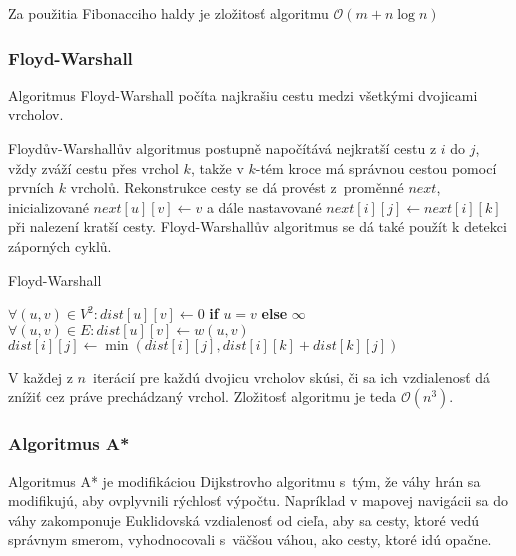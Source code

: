 Za použitia Fibonacciho haldy je zložitosť algoritmu $\mathcal{O}(m + n \log n)$

\subsubsection{Floyd-Warshall}

Algoritmus Floyd-Warshall počíta najkrašiu cestu medzi všetkými
dvojicami vrcholov.

Floydův-Warshallův algoritmus postupně napočítává nejkratší cestu z $i$
do $j$, vždy zváží cestu přes vrchol $k$, takže v $k$-tém kroce
má správnou cestou pomocí prvních $k$ vrcholů.
Rekonstrukce cesty se dá provést z~proměnné $next$, inicializované
$next[u][v] \gets v$ a dále nastavované $next[i][j] \gets next[i][k]$
při nalezení kratší cesty.
Floyd-Warshallův algoritmus se dá také použít k detekci záporných cyklů.

\begin{algorithm}[H]
\caption{Floyd-Warshall}
\begin{algorithmic}[1]
    \State $\forall (u,v) \in V^2 : dist[u][v] \gets 0$
        \textbf{if} $u = v$ \textbf{else} $\infty$
    \State $\forall (u,v) \in E : dist[u][v] \gets w(u,v)$
                \State $dist[i][j] \gets \min(dist[i][j], dist[i][k] + dist[k][j])$
            \EndFor
        \EndFor
    \EndFor
\EndFunction
\end{algorithmic}
\end{algorithm}

V každej z $n$~iterácií pre každú dvojicu vrcholov skúsi,
či sa ich vzdialenosť dá znížiť cez práve prechádzaný vrchol. 
Zložitosť algoritmu je teda $\mathcal{O}(n^3)$.

\subsubsection{Algoritmus A*}
Algoritmus A* je modifikáciou Dijkstrovho algoritmu s~tým,
že váhy hrán sa modifikujú, aby ovplyvnili rýchlosť výpočtu.
Napríklad v mapovej navigácii sa do váhy zakomponuje Euklidovská
vzdialenosť od cieľa, aby sa cesty, ktoré vedú správnym smerom,
vyhodnocovali s~väčšou váhou, ako cesty, ktoré idú opačne.


